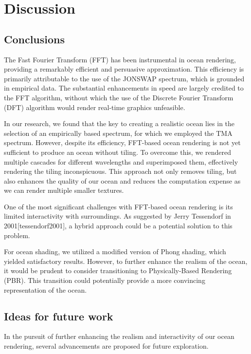 \justifying
\chapter{Discussion}
\label{chapter4}

\section{Conclusions}

The Fast Fourier Transform (FFT) has been instrumental in ocean rendering, providing a remarkably efficient and persuasive approximation. This efficiency is primarily attributable to the use of the JONSWAP spectrum, which is grounded in empirical data. The substantial enhancements in speed are largely credited to the FFT algorithm, without which the use of the Discrete Fourier Transform (DFT) algorithm would render real-time graphics unfeasible.

In our research, we found that the key to creating a realistic ocean lies in the selection of an empirically based spectrum, for which we employed the TMA spectrum. However, despite its efficiency, FFT-based ocean rendering is not yet sufficient to produce an ocean without tiling. To overcome this, we rendered multiple cascades for different wavelengths and superimposed them, effectively rendering the tiling inconspicuous. This approach not only removes tiling, but also enhances the quality of our ocean and reduces the computation expense as we can render multiple smaller textures.

One of the most significant challenges with FFT-based ocean rendering is its limited interactivity with surroundings. As suggested by Jerry Tessendorf in 2001[tessendorf2001], a hybrid approach could be a potential solution to this problem.

For ocean shading, we utilized a modified version of Phong shading, which yielded satisfactory results. However, to further enhance the realism of the ocean, it would be prudent to consider transitioning to Physically-Based Rendering (PBR). This transition could potentially provide a more convincing representation of the ocean.

\section{Ideas for future work}
In the pursuit of further enhancing the realism and interactivity of our ocean rendering, several advancements are proposed for future exploration.


